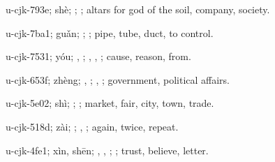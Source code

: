 \begin{multicols}{2}
{\cjkgGlue{}u-cjk-793e; shè; \cjkgGlue{}; \cjkgGlue{}; altars for god of the soil, company, society.

\cjkgGlue{}u-cjk-7ba1; guǎn; \cjkgGlue{}; \cjkgGlue{}; pipe, tube, duct, to control.

\cjkgGlue{}u-cjk-7531; yóu; \cjkgGlue{}, \cjkgGlue{}\cjkgGlue{}\cjkgGlue{}; \cjkgGlue{}, \cjkgGlue{}, \cjkgGlue{}; cause, reason, from.

\cjkgGlue{}u-cjk-653f; zhèng; \cjkgGlue{}, \cjkgGlue{}; \cjkgGlue{}, \cjkgGlue{}; government, political affairs.

\cjkgGlue{}u-cjk-5e02; shì; \cjkgGlue{}; \cjkgGlue{}; market, fair, city, town, trade.

\cjkgGlue{}u-cjk-518d; zài; \cjkgGlue{}\cjkgGlue{}\cjkgGlue{}; \cjkgGlue{}, \cjkgGlue{}; again, twice, repeat.

\cjkgGlue{}u-cjk-4fe1; xìn, shēn; \cjkgGlue{}, \cjkgGlue{}, \cjkgGlue{}; \cjkgGlue{}; trust, believe, letter.

}
\end{multicols}
